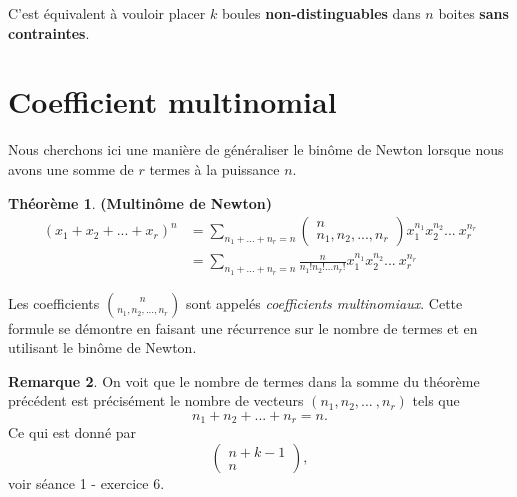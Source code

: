 \documentclass[a4paper,12pt]{report}
\theoremstyle{definition}
\renewcommand{\(}{\left(}
\renewcommand{\)}{\right)}
\renewcommand{\b}{\textbf}
\newtheorem{thm}{Théorème}[section]
\newtheorem{rmk}[thm]{Remarque}
\begin{document}
        \begin{center}
            \setlength{\fboxrule}{1pt}
        \end{center} 
        
        C'est équivalent à vouloir placer $k$ boules \b{non-distinguables} dans $n$ boites \b{sans contraintes}.

    \section{Coefficient multinomial}
    Nous cherchons ici une manière de généraliser le binôme de Newton lorsque nous avons une somme de $r$ termes à la puissance $n$.
    
    \begin{leftbar}
    \begin{thm}
        \textbf{(Multinôme de Newton)} 
        \begin{align*}
            (x_1 + x_2 + ... + x_r)^n &= \sum_{n_1 + ... + n_r = n} \begin{pmatrix}n \\n_1, n_2, ..., n_r \end{pmatrix} x_1^{n_1} x_2^{n_2}...~x_r^{n_r}\\
            & = \sum_{n_1 + ... + n_r = n} \frac{n}{n_1!n_2!...n_r!} x_1^{n_1} x_2^{n_2}...~x_r^{n_r}
        \end{align*}
    \end{thm}
    \end{leftbar}
    
    Les coefficients ${n \choose n_1, n_2, ..., n_r}$ sont appelés \textit{coefficients multinomiaux}.
    Cette formule se démontre en faisant une récurrence sur le nombre de termes et en utilisant le binôme de Newton.
    
    \begin{rmk}
        On voit que le nombre de termes dans la somme du théorème précédent est précisément le nombre de vecteurs $(n_1, n_2, ...~, n_r)$ tels que 
        $$n_1 + n_2 + ... + n_r = n.$$
        Ce qui est donné par
        $$
        \begin{pmatrix}
            n+ k -1 \\
            n
        \end{pmatrix},$$
        voir séance 1 - exercice 6.
    \end{rmk}
    
\end{document}
